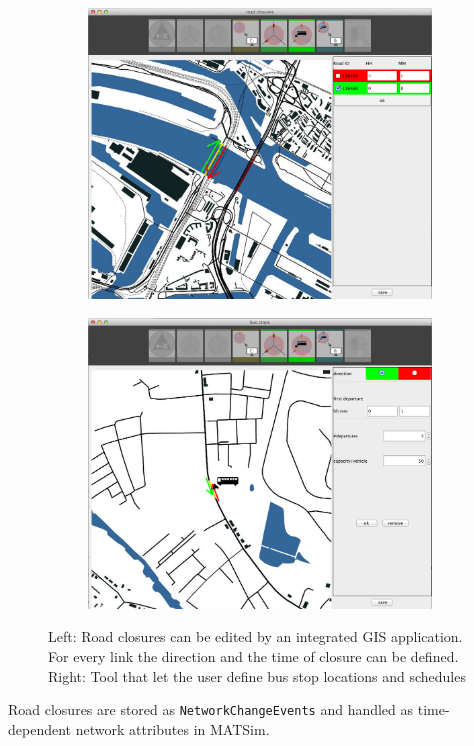 \begin{figure}
\begin{subfigure}
\centering
\includegraphics[width=.475\linewidth]{extending/figures/Evacuation/rd_closure_detail}
\end{subfigure}\hfill
\begin{subfigure}
\centering
\includegraphics[width=.475\linewidth]{extending/figures/Evacuation/bus_stops}
\end{subfigure}
\caption{Left: Road closures can be edited by an integrated GIS application. For every link the direction and the time of closure can be defined. Right: Tool that let the user define bus stop locations and schedules }\label{chap:evac:fig:rd_closures_bus_stops}
\end{figure}
Road closures are stored as \verb+NetworkChangeEvents+ and handled as time-dependent network attributes in MATSim.


